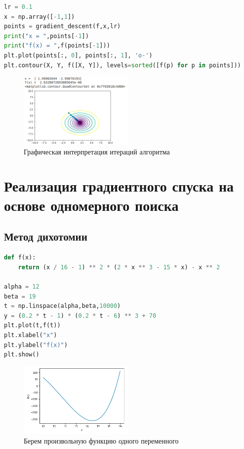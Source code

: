 \begin{lstlisting}[language=Python]
lr = 0.1
x = np.array([-1,1])
points = gradient_descent(f,x,lr)
print("x = ",points[-1])
print("f(x) = ",f(points[-1]))
plt.plot(points[:, 0], points[:, 1], 'o-')
plt.contour(X, Y, f([X, Y]), levels=sorted([f(p) for p in points]))
\end{lstlisting}

\begin{figure}[ht]
    \centering
    \includegraphics[width=0.5\textwidth]{images/gd2.png}
    \caption{Графическая интерпретация итераций алгоритма}
    \label{fig:gd2}
\end{figure}

\newpage

\section{Реализация градиентного спуска на основе одномерного поиска}

\subsection{Метод дихотомии}

\begin{lstlisting}[language=Python]
def f(x):
    return (x / 16 - 1) ** 2 * (2 * x ** 3 - 15 * x) - x ** 2

alpha = 12
beta = 19
t = np.linspace(alpha,beta,10000)
y = (0.2 * t - 1) * (0.2 * t - 6) ** 3 + 70
plt.plot(t,f(t))
plt.xlabel("x")
plt.ylabel("f(x)")
plt.show()
\end{lstlisting}

\begin{figure}[ht]
    \centering
    \includegraphics[width=0.5\textwidth]{images/t21.png}
    \caption{Берем произвольную функцию одного переменного}
    \label{fig:t21}
\end{figure}

